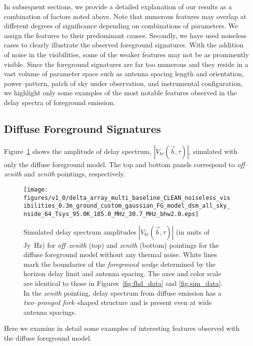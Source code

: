 \documentclass[preprint2,iop,numberedappendix]{emulateapj}
\begin{document}
In subsequent sections, we provide a detailed explanation of our results as a combination of factors noted above. Note that numerous features may overlap at different degrees of significance depending on combinations of parameters. We assign the features to their predominant causes. Secondly, we have used noiseless cases to clearly illustrate the observed foreground signatures. With the addition of noise in the visibilities, some of the weaker features may not be as prominently visible. Since the foreground signatures are far too numerous and they reside in a vast volume of parameter space such as antenna spacing length and orientation, power--pattern, patch of sky under observation, and instrumental configuration, we highlight only some examples of the most notable features observed in the delay spectra of foreground emission.

\subsection{Diffuse Foreground Signatures}\label{sec:diffuse}

Figure~\ref{fig:noiseless-dsm-delay-spectrum} shows the amplitude of delay spectrum, $|V_{b\tau}(\vec{b},\tau)|$, simulated with only the diffuse foreground model. The top and bottom panels correspond to {\it off--zenith} and {\it zenith} pointings, respectively. 

\begin{figure}[htb]
\centering
\texttt{[image: figures/v1\_0/delta\_array\_multi\_baseline\_CLEAN\_noiseless\_visibilities\_0.3m\_ground\_custom\_gaussian\_FG\_model\_dsm\_all\_sky\_nside\_64\_Tsys\_95.0K\_185.0\_MHz\_30.7\_MHz\_bhw2.0.eps]}
\caption{Simulated delay spectrum amplitudes $|V_{b\tau}(\vec{b},\tau)|$ (in units of Jy~Hz) for {\it off--zenith} (top) and {\it zenith} (bottom) pointings for the diffuse foreground model without any thermal noise. White lines mark the boundaries of the {\it foreground wedge} determined by the horizon delay limit and antenna spacing. The axes and color scale are identical to those in Figures~\ref{fig:fhd_data} and \ref{fig:sim_data}. In the {\it zenith} pointing, delay spectrum from diffuse emission has a {\it two--pronged fork}--shaped structure and is present even at wide antenna spacings. \label{fig:noiseless-dsm-delay-spectrum}}
\end{figure}

Here we examine in detail some examples of interesting features observed with the diffuse foreground model.
\end{document}
